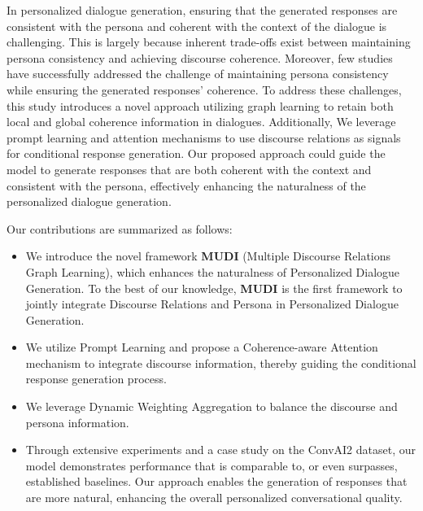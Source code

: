 In personalized dialogue generation, ensuring that the generated responses are consistent with the persona and coherent with the context of the dialogue is challenging. This is largely because inherent trade-offs exist between maintaining persona consistency and achieving discourse coherence. Moreover, few studies have successfully addressed the challenge of maintaining persona consistency while ensuring the generated responses' coherence. To address these challenges, this study introduces a novel approach utilizing graph learning to retain both local and global coherence information in dialogues. Additionally, We leverage prompt learning and attention mechanisms to use discourse relations as signals for conditional response generation. Our proposed approach could guide the model to generate responses that are both coherent with the context and consistent with the persona, effectively enhancing the naturalness of the personalized dialogue generation.

Our contributions are summarized as follows:
\begin{itemize}
    \item We introduce the novel framework \textbf{MUDI} (Multiple Discourse Relations Graph Learning), which enhances the naturalness of Personalized Dialogue Generation. To the best of our knowledge, \textbf{MUDI} is the first framework to jointly integrate Discourse Relations and Persona in Personalized Dialogue Generation.
    
    \item We utilize Prompt Learning and propose a Coherence-aware Attention mechanism to integrate discourse information, thereby guiding the conditional response generation process.

    \item We leverage Dynamic Weighting Aggregation to balance the discourse and persona information. 
    
    \item Through extensive experiments and a case study on the ConvAI2 dataset, our model demonstrates performance that is comparable to, or even surpasses, established baselines. Our approach enables the generation of responses that are more natural, enhancing the overall personalized conversational quality.
\end{itemize}

\EndChapter
